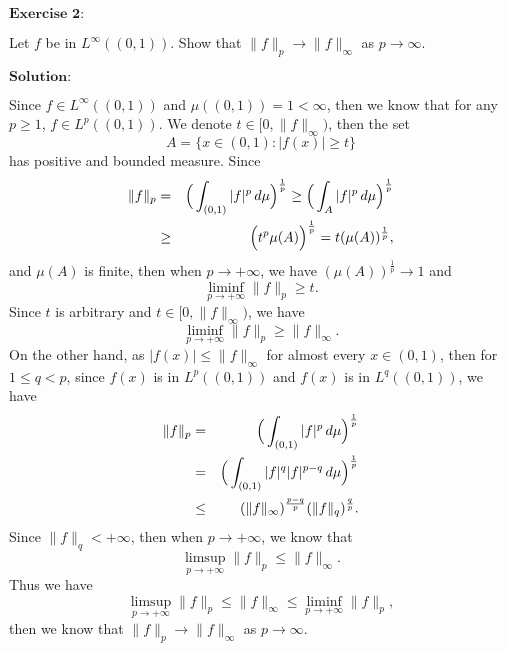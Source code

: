 \documentclass[12pt,a4paper]{ctexart}
\begin{document}
\vspace{8pt}
$\textbf{Exercise 2:}$

Let $f$ be in $L^{\infty} ((0, 1))$. Show that $\|f \|_{p} \rightarrow \|f \|_{\infty}$ as $p \rightarrow \infty$.

\vspace{8pt}
$\textbf{Solution:}$

Since $f \in L^{\infty} ((0,1))$ and $\mu((0, 1)) = 1 < \infty$, then we know that for any $p \geq 1$, $f \in L^{p}((0, 1))$. We denote $t \in [0, \|f \|_{\infty})$, then the set 
\begin{equation*}
   A = \{x \in (0, 1): |f(x)| \geq t \}
\end{equation*}
has positive and bounded measure. Since
\begin{eqnarray*}
\|f\|_{p} & = & \Big{(} \int_{(0, 1)}^{} |f|^{p} \, d \mu \Big{)}^{\frac{1}{p}} \geq \Big{(} \int_{A}^{} |f|^{p} \, d \mu \Big{)}^{\frac{1}{p}} \\
& \geq & \Big{(} t^{p} \mu(A)\Big{)}^{\frac{1}{p}} = t (\mu(A))^{\frac{1}{p}},
\end{eqnarray*}
and $\mu(A)$ is finite, then when $p \to + \infty$, we have $(\mu(A))^{\frac{1}{p}} \to 1$ and
\begin{equation*}
   \liminf_{p \to + \infty} \|f\|_{p} \geq t.
\end{equation*}
Since $t$ is arbitrary and $t \in [0, \|f \|_{\infty})$, we have
\begin{equation*}
   \liminf_{p \to + \infty} \|f\|_{p} \geq \|f \|_{\infty} .
\end{equation*}
On the other hand, as $|f(x)| \leq \|f\|_{\infty}$ for almost every $x \in (0, 1)$, then for $1 \leq q < p$, since $f(x)$ is in $L^{p}((0, 1))$ and $f(x)$ is in $L^{q}((0, 1))$, we have
\begin{eqnarray*}
\|f\|_{p} & = & \Big{(} \int_{(0, 1)}^{} |f|^{p} \, d \mu \Big{)}^{\frac{1}{p}} \\
& = & \Big{(} \int_{(0, 1)}^{} |f|^{q} |f|^{p - q} \, d \mu \Big{)}^{\frac{1}{p}} \\
& \leq & (\|f\|_{\infty})^{\frac{p - q}{p}} (\|f\|_{q})^{\frac{q}{p}}.
\end{eqnarray*}
Since $\|f\|_{q} < + \infty$, then when $p \to + \infty$, we know that
\begin{equation*}
   \limsup_{p \to + \infty} \|f\|_{p} \leq \|f \|_{\infty} .
\end{equation*}
Thus we have
\begin{equation*}
   \limsup_{p \to + \infty} \|f\|_{p} \leq \|f \|_{\infty} \leq \liminf_{p \to + \infty} \|f\|_{p},
\end{equation*}
then we know that $\|f \|_{p} \rightarrow \|f \|_{\infty}$ as $p \rightarrow \infty$.
\end{document}
